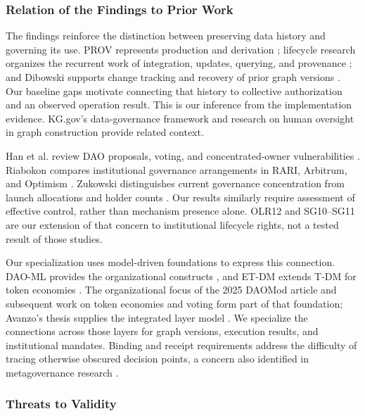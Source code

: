\documentclass[journal]{IEEEtran}
\begin{document}
\subsubsection{Relation of the Findings to Prior Work}

The findings reinforce the distinction between preserving data history
and governing its use. PROV represents production and derivation
\cite{Moreau2013PROV}; lifecycle research organizes the recurrent work
of integration, updates, querying, and provenance
\cite{Geisler2025KGLifecycle}; and Dibowski supports change tracking
and recovery of prior graph versions \cite{Dibowski2024TraceabilityKG}.
Our baseline gaps motivate connecting that history to collective
authorization and an observed operation result. This is our inference
from the implementation evidence. KG.gov's data-governance framework
\cite{MeronoPenuela2025KGgov} and research on human oversight in graph
construction \cite{Zhang2025TrustworthyKG} provide related context.

Han et al. review DAO proposals, voting, and concentrated-owner
vulnerabilities \cite{Han2025DAOReview}. Riabokon compares
institutional governance arrangements in RARI, Arbitrum,
and Optimism \cite{Riabokon2026ProgrammableGovernance}.
Zukowski distinguishes current governance concentration
from launch allocations and holder counts
\cite{Zukowski2026GovernanceConcentration}.
Our results similarly require assessment of effective control,
rather than mechanism presence alone. OLR12 and SG10--SG11
are our extension of that concern to institutional lifecycle
rights, not a tested result of those studies.

Our specialization uses model-driven foundations to express this connection.
DAO-ML provides the organizational constructs \cite{Avanzo2024DAOML},
and ET-DM extends T-DM for token economies \cite{Avanzo2025ETDM}.
The organizational focus of the 2025 DAOMod article
\cite{Avanzo2025DAOMod} and subsequent work on token economies and voting
\cite{Avanzo2026DAOModCoordination} form part of that foundation;
Avanzo's thesis supplies the integrated layer model
\cite{Avanzo2025Thesis}. We specialize the connections across those layers
for graph versions, execution results, and institutional mandates.
Binding and receipt requirements address the difficulty of tracing
otherwise obscured decision points, a concern also identified in
metagovernance research \cite{Weidener2026Metagovernance}.

\subsubsection{Threats to Validity}
\end{document}
